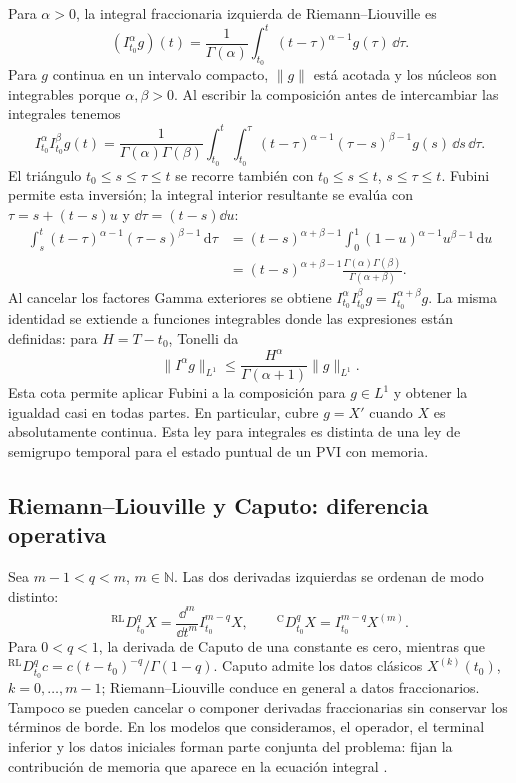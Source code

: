 Para \(\alpha>0\), la integral fraccionaria izquierda de
Riemann--Liouville es
\begin{equation}
 (I_{t_0}^{\alpha}g)(t)=\frac{1}{\Gamma(\alpha)}
 \int_{t_0}^{t}(t-\tau)^{\alpha-1}g(\tau)\,\dd\tau.
 \label{eq:rl-integral}
\end{equation}
Para \(g\) continua en un intervalo compacto, \(\|g\|\) está acotada y
los núcleos son integrables porque \(\alpha,\beta>0\). Al escribir la
composición antes de intercambiar las integrales tenemos
\[
 I_{t_0}^{\alpha}I_{t_0}^{\beta}g(t)=
 \frac1{\Gamma(\alpha)\Gamma(\beta)}
 \int_{t_0}^t\int_{t_0}^{\tau}
 (t-\tau)^{\alpha-1}(\tau-s)^{\beta-1}g(s)\,\dd s\,\dd\tau.
\]
El triángulo \(t_0\le s\le\tau\le t\) se recorre también con
\(t_0\le s\le t\), \(s\le\tau\le t\). Fubini permite esta inversión;
la integral interior resultante se evalúa con
\(\tau=s+(t-s)u\) y \(\dd\tau=(t-s)\dd u\):
\begin{align*}
 \int_s^t(t-\tau)^{\alpha-1}(\tau-s)^{\beta-1}\,\mathrm d\tau
 &=(t-s)^{\alpha+\beta-1}
   \int_0^1(1-u)^{\alpha-1}u^{\beta-1}\,\mathrm du\\
 &=(t-s)^{\alpha+\beta-1}
   \frac{\Gamma(\alpha)\Gamma(\beta)}{\Gamma(\alpha+\beta)}.
\end{align*}
Al cancelar los factores Gamma exteriores se obtiene
\(I_{t_0}^{\alpha}I_{t_0}^{\beta}g=I_{t_0}^{\alpha+\beta}g\).
La misma identidad se extiende a funciones integrables donde las expresiones
están definidas: para $H=T-t_0$, Tonelli da
\[
 \|I^\alpha g\|_{L^1}\leq
 \frac{H^\alpha}{\Gamma(\alpha+1)}\|g\|_{L^1}.
\]
Esta cota permite aplicar Fubini a la composición para $g\in L^1$ y obtener
la igualdad casi en todas partes. En particular, cubre $g=X'$ cuando $X$ es
absolutamente continua. Esta ley para integrales es distinta de
una ley de semigrupo temporal para el estado puntual de un PVI con memoria.

\subsection{Riemann--Liouville y Caputo: diferencia operativa}

Sea \(m-1<q<m\), \(m\in\mathbb N\). Las dos derivadas izquierdas se ordenan de
modo distinto:
\begin{equation}
 {}^{\mathrm{RL}}D_{t_0}^{q}X
 =\frac{\dd^m}{\dd t^m}I_{t_0}^{m-q}X,
 \qquad
 {}^{\mathrm C}D_{t_0}^{q}X
 =I_{t_0}^{m-q}X^{(m)}.
 \label{eq:rl-caputo-general}
\end{equation}
Para \(0<q<1\), la derivada de Caputo de una constante es cero, mientras que
\({}^{\mathrm{RL}}D_{t_0}^{q}c=
c(t-t_0)^{-q}/\Gamma(1-q)\). Caputo admite los datos clásicos
\(X^{(k)}(t_0)\), \(k=0,\ldots,m-1\); Riemann--Liouville conduce en general a
datos fraccionarios. Tampoco se pueden cancelar o componer derivadas
fraccionarias sin conservar los términos de borde. En los modelos que
consideramos, el operador, el terminal inferior y los datos iniciales forman
parte conjunta del problema: fijan la contribución de memoria que aparece
en la ecuación integral
\cite{Podlubny1999,Monje2010}.

